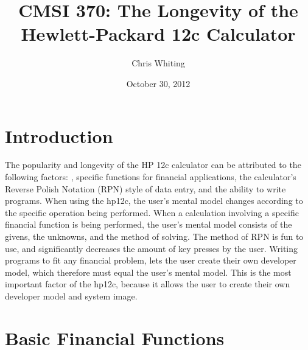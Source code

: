 \documentclass{article}
\title{CMSI 370: The Longevity of the Hewlett-Packard 12c Calculator}
\author{Chris Whiting}
\date{October 30, 2012}
\begin{document}
\maketitle


\pagebreak
\tableofcontents

\pagebreak

%
%
\section{Introduction}
\label{introduction}

The popularity and longevity of the HP 12c calculator can be attributed to the following factors: , specific functions for financial applications, the calculator's Reverse Polish Notation (RPN) style of data entry, and the ability to write programs. When using the hp12c, the user's mental model changes according to the specific operation being performed. When a calculation involving a specific financial function is being performed, the user's mental model consists of the givens, the unknowns, and the method of solving. The method of RPN is fun to use, and significantly decreases the amount of key presses by the user. Writing programs to fit any financial problem, lets the user create their own developer model, which therefore must equal the user's mental model. This is the most important factor of the hp12c, because it allows the user to create their own developer model and system image.


\section{Basic Financial Functions}
\end{document}
